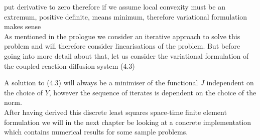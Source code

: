 \documentclass[../draft_1.tex]{subfiles}
\begin{document}
put derivative to zero therefore if we assume local convexity must be an extremum, positive definite, means minimum, therefore variational formulation makes sense 
\bigskip
\\
As mentioned in the prologue we consider an iterative approach to solve this problem and will therefore consider linearisations of the problem. But before going into more detail about that, let us consider the variational formulation of the coupled reaction-diffusion system (4.3)

A solution to (4.3) will always be a minimiser of the functional $J$ independent on the choice of $Y$, however the sequence of iterates is dependent on the choice of the norm. 
\smallskip
\\
After having derived this discrete least squares space-time finite element formulation we will in the next chapter be looking at a concrete implementation which contains numerical results for some sample problems. 
\end{document}
